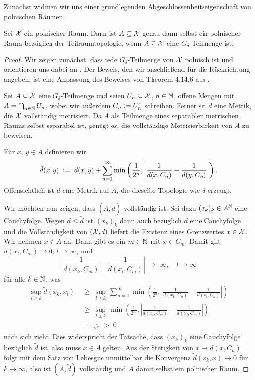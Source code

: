 \documentclass[../thesis/thesis.tex]{subfiles}
\begin{document}
	Zunächst widmen wir uns einer grundlegenden Abgeschlossenheitseigenschaft von polnischen Räumen.
	
	\begin{Satz}[Alexandroff]
		\label{satz:alexandroff}
		Sei $\mathcal{X}$ ein polnischer Raum. Dann ist $A \subseteq \mathcal{X}$ genau dann selbst ein polnischer Raum bezüglich der Teilraumtopologie, 
		wenn $A \subseteq \mathcal{X}$ eine $G_\delta$-Teilmenge ist.
	\end{Satz}
	
	\begin{proof}
		Wir zeigen zunächst, dass jede $G_\delta$-Teilmenge von $\mathcal{X}$ polnisch ist und orientieren uns dabei an \cite[Theorem 7]{JordanBell.2014}. Der Beweis, den wir anschließend für 
		die Rückrichtung angeben, ist eine Anpassung des Beweises von Theorem 4.14.6 aus \cite{Simon.2015}.
		
		Sei $A \subseteq \mathcal{X}$ eine $G_\delta$-Teilmenge und seien 
		$U_n \subseteq \mathcal{X}$, $n \in \mathbb{N}$, offene Mengen mit 
		$A = \bigcap_{n \in \mathbb{N}} U_n$, wobei wir außerdem 
		$C_n \vcentcolon = U_n^{\mathsf{c}}$ schreiben. Ferner sei 
		$d$ eine Metrik, die $\mathcal{X}$ vollständig metrisiert. 
		Da $A$ als Teilmenge eines separablen metrischen Raums 
		selbst separabel ist, genügt es, die vollständige Metrisierbarkeit 
		von $A$ zu beweisen.
		
		Für $x$, $y \in A$ definieren wir
		\[\tilde{d}(x, y) \; \vcentcolon = \; d(x, y) + \sum_{n=1}^{\infty} \min \left(
		\frac{1}{2^n}, \left| \frac{1}{d(x, C_n)} - \frac{1}{d(y, C_n)} \right|
		\right) \text{.}\]
		Offensichtlich ist $\tilde{d}$ eine Metrik auf $A$, 
		die dieselbe Topologie wie $d$ erzeugt. 
		
		Wir möchten nun zeigen, dass $(A, \tilde{d})$ vollständig ist. 
		Sei dazu $(x_k)_k \in A^{\mathbb{N}}$ eine Cauchyfolge. Wegen $d \leq \tilde{d}$ 
		ist $(x_k)_k$ dann auch bezüglich $d$ eine Cauchyfolge und die 
		Vollständigkeit von $(\mathcal{X}, d)$ liefert die Existenz eines Grenzwertes 
		$x \in \mathcal{X}$. Wir nehmen $x \notin A$ an. Dann gibt es ein $m \in \mathbb{N}$ mit 
		$x \in C_m$. Damit gilt $d(x_l, C_m) \to 0$, $l \to \infty$, und
		$$ \left| \frac{1}{d(x_k, C_m)} -
		\frac{1}{d(x_l, C_m)} \right| \; \to \; \infty, \quad l \to \infty$$
		für alle $k \in \mathbb{N}$, was
		\begin{align*}
			\sup_{l \geq k} \tilde{d}(x_k, x_l) \; &\geq \; \sup_{l \geq k} \, \sum_{n=1}^{\infty} \min \left(\frac{1}{2^n}, \left| \frac{1}{d(x_k, C_n)} -\frac{1}{d(x_l, C_n)} \right|\right) \\
			                                       &\geq \; \sup_{l \geq k} \, \min \left(\frac{1}{2^m}, \left| \frac{1}{d(x_k, C_m)} -\frac{1}{d(x_l, C_m)} \right|\right) \\
			                                       &=    \; \frac{1}{2^m} \; > \; 0
		\end{align*}
		nach sich zieht. Dies widerspricht der Tatsache, dass $(x_k)_k$ eine Cauchyfolge 
		bezüglich $\tilde{d}$ ist, also muss $x \in A$ gelten. 
		Aus der Stetigkeit von $x \mapsto d(x, C_n)$ folgt mit dem 
		Satz von Lebesgue unmittelbar die Konvergenz 
		$\tilde{d}(x_k, x) \to 0$ für $k \to \infty$,
		also ist $(A, \tilde{d})$ vollständig und $A$ damit selbst ein
		polnischer Raum.
		

\end{proof}
\end{document}
